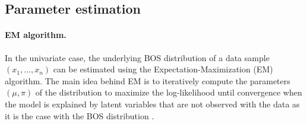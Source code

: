 

\subsection{Parameter estimation}
\paragraph{EM algorithm.} In the univariate case, the underlying BOS distribution of a data sample $(x_1, \ldots, x_n)$ can be estimated using the Expectation-Maximization (EM) algorithm. The main idea behind EM is to iteratively compute the parameters $(\mu, \pi)$ of the distribution to maximize the log-likelihood until convergence when the model is explained by latent variables that are not observed with the data as it is the case with the BOS distribution \citep{biernacki2016model}.
